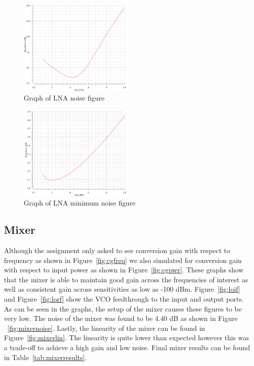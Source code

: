 \begin{figure}[H]
   \centering
    \includegraphics[width=0.5\textwidth]{figures/lnanoise.png}
    \caption{Graph of LNA noise figure}
    \label{fig:lnanoise}
\end{figure}

\begin{figure}[H]
   \centering
    \includegraphics[width=0.5\textwidth]{figures/lnanoisemin.png}
    \caption{Graph of LNA minimum noise figure}
    \label{fig:lnanoisemin}
\end{figure}

\subsection{Mixer}
Although the assignment only asked to see conversion gain with respect to frequency as shown in Figure~\ref{fig:cgfreq} we also simulated for conversion gain with respect to input power as shown in Figure~\ref{fig:cgpwr}. These graphs show that the mixer is able to maintain good gain across the frequencies of interest as well as consistent gain across sensitivities as low as -100 dBm. Figure~\ref{fig:loif} and Figure~\ref{fig:lorf} show the VCO feedthrough to the input and output ports. As can be seen in the graphs, the setup of the mixer causes these figures to be very low. The noise of the mixer was found to be 4.40 dB as shown in Figure ~\ref{fig:mixernoise}. Lastly, the linearity of the mixer can be found in Figure~\ref{fig:mixerlin}. The linearity is quite lower than expected however this was a trade-off to achieve a high gain and low noise. Final mixer results can be found in Table~\ref{tab:mixerresults}.

